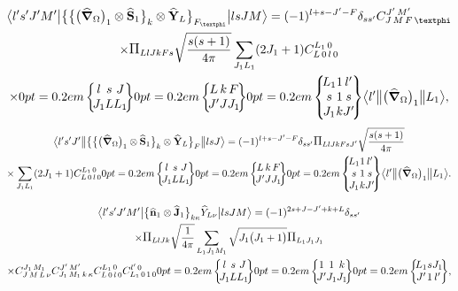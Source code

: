 \begin{multline}
\braOket{ l^{\prime} s^{\prime} J^{\prime} M^{\prime}}{\bigl\{\bigl\{\bigl(\delop_{\Omega}\bigr)_{1} \otimes \widehat{\vect{S}}_{1}\bigr\}_{k} \otimes \widehat{\vect{Y}}_{L}\bigr\}_{F_{\varphi}}}{l s J M}=(-1)^{l+s-J^{\prime}-F} \delta_{s s^{\prime}}
\clebsch{J}{M}{F}{\varphi}{J^{\prime}}{M^{\prime}} \\
 \times \Fact{L l J k F s}\sqrt{\frac{s(s+1)}{4 \pi}} \sum_{J_{1} L_{1}}(2 J_1+1)
\clebsch{L}{0}{l}{0}{L_{1}}{0} \\
 \times
\sixj{l}{s}{J}{J_{1}}{L}{L_{1}}
\sixj{L}{k}{F}{J^{\prime}}{J}{J_{1}}
\ninej{L_{1}}{1}{l^{\prime}}{s}{1}{s}{J_{1}}{k}{J^{\prime}}
\braOketred{ l^{\prime}}{\bigl(\delop_{\Omega}\bigr)_{1}}{ L_{1}},  \label{eq:13:2:137}
\end{multline}
\begin{multline*}
\braOketred{ l^{\prime} s^{\prime} J^{\prime}}{\bigl\{\bigl\{\bigl(\delop_{\Omega}\bigr)_{1} \otimes \widehat{\vect{S}}_{1}\bigr\}_{k} \otimes \widehat{\vect{Y}}_{L}\bigr\}_{F}}{l s J}=(-1)^{l+s-J^{\prime}-F} \delta_{s s^{\prime}} \Fact{L l J k F s J^{\prime}}\sqrt{\frac{s(s+1)}{4 \pi}} \\
\times \sum_{J_{1} L_{1}}(2 J_1+1)
\clebsch{L}{0}{l}{0}{L_{1}}{0}
\sixj{l}{s}{J}{J_{1}}{L}{L_{1}}
\sixj{L}{k}{F}{J^{\prime}}{J}{J_{1}}
\ninej{L_{1}}{1}{l^{\prime}}{s}{1}{s}{J_{1}}{k}{J^{\prime}}
\braOketred{ l^{\prime}}{\bigl(\delop_{\Omega}\bigr)_{1}}{ L_{1}}.
\end{multline*}

\begin{multline}
\braOket{ l^{\prime} s^{\prime} J^{\prime} M^{\prime}}{\bigl\{\widehat{\vect{n}}_{1} \otimes \widehat{\vect{J}}_{1}\bigr\}_{k \kappa} \widehat{Y}_{L \nu}}{l s J M}=(-1)^{2 s+J-J^{\prime}+k+L} \delta_{s s^{\prime}} \\
 \times \Fact{L l J k}\sqrt{\frac{1}{4 \pi}} \sum_{L_{1} J_{1} M_{1}} \sqrt{J_{1}\bigl(J_{1}+1\bigr)}\Fact{L_1 J_1 J_1} \\
 \times 
\clebsch{J}{M}{L}{\nu}{J_{1}}{M_{1}} 
\clebsch{J_{1}}{M_{1}}{k}{\kappa}{J^{\prime}}{M^{\prime}} 
\clebsch{L}{0}{l}{0}{L_{1}}{0}
\clebsch{L_{1}}{0}{1}{0}{l^{\prime}}{0}
\sixj{l}{s}{J}{J_{1}}{L}{L_{1}}
\sixj{1}{1}{k}{J^{\prime}}{J_{1}}{J_{1}}
\sixj{L_{1}}{s}{J_{1}}{J^{\prime}}{1}{l^{\prime}},  \label{eq:13:2:138}
\end{multline}

